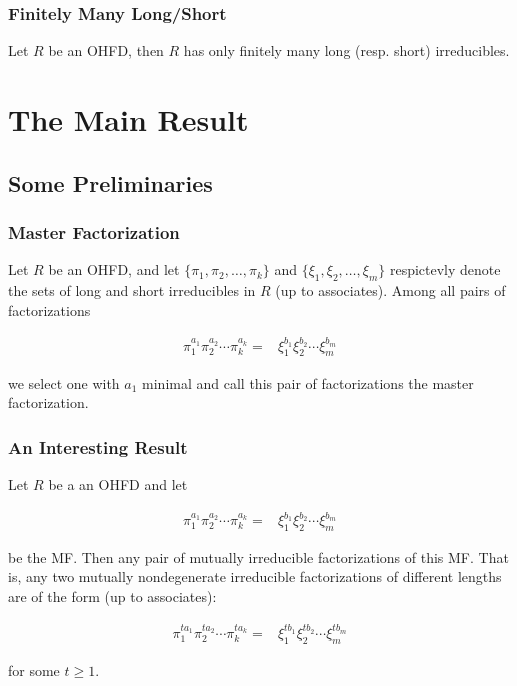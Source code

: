 \begin{frame}
	\frametitle{Finitely Many Long/Short}
	\begin{fact}
		Let $R$ be an OHFD, then $R$ has only finitely many long (resp. short) irreducibles.
	\end{fact}
\end{frame}

\section{The Main Result}

\subsection{Some Preliminaries }

\begin{frame}
  \frametitle{Master Factorization }
  \begin{definition}
    Let $R$ be an OHFD, and let $\{\pi_{1},\pi_{2},\ldots,\pi_{k}\}$ and $\{\xi_{1},\xi_{2},\ldots,\xi_{m}\}$ respictevly denote the sets of long and short irreducibles in $R$ (up to associates).
    Among all pairs of factorizations

    \begin{align*}
      \pi_{1}^{a_{1}}\pi_{2}^{a_{2}}\cdots\pi_{k}^{a_{k}}= & \xi_{1}^{b_{1}}\xi_{2}^{b_{2}}\cdots\xi_{m}^{b_{m}}
    \end{align*}

    we select one with $a_{1}$ minimal and call this pair of factorizations the \alert{master factorization}.
  \end{definition}
\end{frame}

\begin{frame}
  \frametitle{An Interesting Result }
  \begin{fact}
    Let $R$ be a an OHFD and let

    \begin{align*}
      \pi_{1}^{a_{1}}\pi_{2}^{a_{2}}\cdots\pi_{k}^{a_{k}}= & \xi_{1}^{b_{1}}\xi_{2}^{b_{2}}\cdots\xi_{m}^{b_{m}}
    \end{align*}

    be the MF.
    Then any pair of mutually irreducible factorizations of this MF.
    That is, any two mutually nondegenerate irreducible factorizations of different lengths are of the form (up to associates):

    \begin{align*}
      \pi_{1}^{ta_{1}}\pi_{2}^{ta_{2}}\cdots\pi_{k}^{ta_{k}}= & \xi_{1}^{tb_{1}}\xi_{2}^{tb_{2}}\cdots\xi_{m}^{tb_{m}}
    \end{align*}

    for some $t\geq1$.
  \end{fact}
\end{frame}

